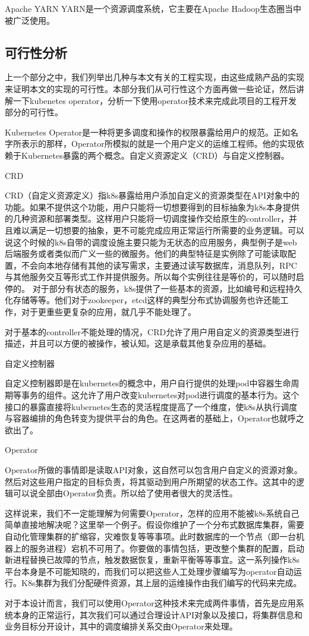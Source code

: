 Apache YARN
YARN是一个资源调度系统，它主要在Apache Hadoop生态圈当中被广泛使用。

\subsection{可行性分析}

上一个部分之中，我们列举出几种与本文有关的工程实现，由这些成熟产品的实现来证明本文的实现的可行性。本部分我们从可行性这个方面再做一些论证，然后讲解一下kubenetes operator，分析一下使用operator技术来完成此项目的工程开发部分的可行性。

Kubernetes Operator是一种将更多调度和操作的权限暴露给用户的规范。正如名字所表示的那样，Operator所模拟的就是一个用户定义的运维工程师。他的实现依赖于Kubernetes暴露的两个概念。自定义资源定义（CRD）与自定义控制器。

CRD

CRD（自定义资源定义）指k8s暴露给用户添加自定义的资源类型在API对象中的功能。如果不提供这个功能，用户只能将一切想要得到的目标抽象为k8s本身提供的几种资源和部署类型。这样用户只能将一切调度操作交给原生的controller，并且难以满足一切想要的抽象，更不可能完成应用正常运行所需要的业务逻辑。可以说这个时候的k8s自带的调度设施主要只能为无状态的应用服务，典型例子是web后端服务或者类似而广义一些的微服务。他们的典型特征是实例除了可能读取配置，不会向本地存储有其他的读写需求，主要通过读写数据库，消息队列，RPC与其他服务交互等形式工作并提供服务。所以每个实例往往是等价的，可以随时启停的。
对于部分有状态的服务，k8s提供了一些基本的资源，比如编号和远程持久化存储等等。他们对于zookeeper，etcd这样的典型分布式协调服务也许还能工作，对于更重些更复杂的应用，就几乎不能处理了。

对于基本的controller不能处理的情况，CRD允许了用户用自定义的资源类型进行描述，并且可以方便的被操作，被认知。这是承载其他复杂应用的基础。

自定义控制器

自定义控制器即是在kubernetes的概念中，用户自行提供的处理pod中容器生命周期等事务的组件。这允许了用户改变kubernetes对pod进行调度的基本行为。这个接口的暴露直接将kubernetes生态的灵活程度提高了一个维度，使k8s从执行调度与容器编排的角色转变为提供平台的角色。在这两者的基础上，Operator也就呼之欲出了。

Operator

Operator所做的事情即是读取API对象，这自然可以包含用户自定义的资源对象。然后对这些用户指定的目标负责，将其驱动到用户所期望的状态工作。这其中的逻辑可以说全部由Operator负责。所以给了使用者很大的灵活性。

这样说来，我们不一定能理解为何需要Operator，怎样的应用不能被k8s系统自己简单直接地解决呢？这里举一个例子。假设你维护了一个分布式数据库集群，需要自动化管理集群的扩缩容，灾难恢复等等事项。此时数据库的一个节点（即一台机器上的服务进程）宕机不可用了。你要做的事情包括，更改整个集群的配置，启动新进程替换已故障的节点，触发数据恢复，重新平衡等等事宜。这一系列操作k8s平台本身是不可能知晓的，而我们可以把这些人工处理步骤编写为operator自动运行。K8s集群为我们分配硬件资源，其上层的运维操作由我们编写的代码来完成。

对于本设计而言，我们可以使用Operator这种技术来完成两件事情，首先是应用系统本身的正常运行，其次我们可以通过合理设计API对象以及接口，将集群信息和业务目标分开设计，其中的调度编排关系交由Operator来处理。
